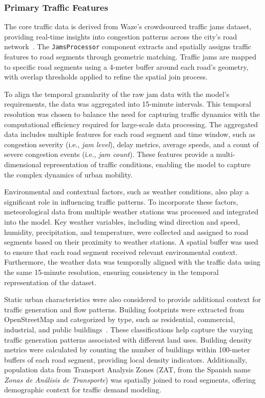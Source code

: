 \documentclass[11pt, a4paper]{article}
\begin{document}
\subsubsection{Primary Traffic Features}
The core traffic data is derived from Waze's crowdsourced traffic jams dataset, providing real-time insights into congestion patterns across the city's road network~\cite{bedoyamaya2022estimating}. The \texttt{JamsProcessor} component extracts and spatially assigns traffic features to road segments through geometric matching. Traffic jams are mapped to specific road segments using a 4-meter buffer around each road's geometry, with overlap thresholds applied to refine the spatial join process.

To align the temporal granularity of the raw jam data with the model's requirements, the data was aggregated into 15-minute intervals. This temporal resolution was chosen to balance the need for capturing traffic dynamics with the computational efficiency required for large-scale data processing. The aggregated data includes multiple features for each road segment and time window, such as congestion severity (i.e., \textit{jam level}), delay metrics, average speeds, and a count of severe congestion events (i.e., \textit{jam count}). These features provide a multi-dimensional representation of traffic conditions, enabling the model to capture the complex dynamics of urban mobility.

Environmental and contextual factors, such as weather conditions, also play a significant role in influencing traffic patterns. To incorporate these factors, meteorological data from multiple weather stations was processed and integrated into the model. Key weather variables, including wind direction and speed, humidity, precipitation, and temperature, were collected and assigned to road segments based on their proximity to weather stations. A spatial buffer was used to ensure that each road segment received relevant environmental context. Furthermore, the weather data was temporally aligned with the traffic data using the same 15-minute resolution, ensuring consistency in the temporal representation of the dataset.

Static urban characteristics were also considered to provide additional context for traffic generation and flow patterns. Building footprints were extracted from OpenStreetMap and categorized by type, such as residential, commercial, industrial, and public buildings~\cite{haklay2008openstreetmap}. These classifications help capture the varying traffic generation patterns associated with different land uses. Building density metrics were calculated by counting the number of buildings within 100-meter buffers of each road segment, providing local density indicators. Additionally, population data from Transport Analysis Zones (ZAT, from the Spanish name \textit{Zonas de Análisis de Transporte}) was spatially joined to road segments, offering demographic context for traffic demand modeling.
\end{document}
